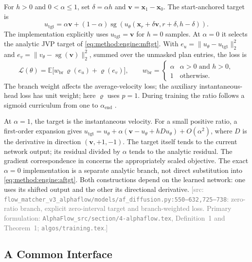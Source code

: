 \documentclass[headsepline,footsepline,footinclude=false,oneside,fontsize=11pt,paper=a4,listof=totoc,bibliography=totoc]{scrbook}
\theoremstyle{definition}
\theoremstyle{plain}
\theoremstyle{remark}
\newcommand{\vect}[1]{\boldsymbol{#1}}
\newcommand{\sidx}[1]{_{\textrm{#1}}}
\newcommand{\E}{\mathbb{E}}                    %
\newcommand{\sg}{\operatorname{sg}}            %
\newcommand{\vfield}{v}                        %
\newcommand{\afield}{u}                        %
\newif\ifsubmission
\newcommand{\srcnote}[1]{\ifsubmission\else\textcolor{gray}{\footnotesize\textsf{[src: #1]}}\fi}
\begin{document}
For $h>0$ and $0<\alpha\le1$, set $\delta=\alpha h$ and
$\vect{v}=\vect{x}_{1}-\vect{x}_{0}$. The start-anchored target is
\begin{equation}\label{eq:method:engine:aftgt}
  \afield\sidx{tgt}
  =\alpha\vect{v}+(1-\alpha)\sg\!\left(
    \afield_{\theta}(\vect{x}_{r}+\delta\vect{v},r+\delta,h-\delta)\right).
\end{equation}
The implementation explicitly uses $\afield\sidx{tgt}=\vect{v}$ for $h=0$ samples. At
$\alpha=0$ it selects the analytic JVP target of \eqref{eq:method:engine:mftgt}.
With $e_u=\|\afield_{\theta}-\afield\sidx{tgt}\|_2^2$ and
$e_v=\|\vfield_{\theta}-\sg(\vect{v})\|_2^2$, summed over the unmasked plan entries, the loss is
\begin{equation}\label{eq:method:engine:afloss}
  \mathcal{L}(\theta)=\E\big[w\sidx{br}\,\varrho(e_u)+\varrho(e_v)\big],
  \qquad
  w\sidx{br}=\begin{cases}
    \alpha & \alpha>0\text{ and }h>0,\\
    1 & \text{otherwise}.
  \end{cases}
\end{equation}
The branch weight affects the average-velocity loss; the auxiliary instantaneous-head loss has
unit weight; here $\varrho$ uses $p=1$. During training the ratio follows a sigmoid curriculum from one to
$\alpha\sidx{end}$ \parencite[Alg.~2]{zhang2025alphaflow}.

At $\alpha=1$, the target is the instantaneous velocity. For a small positive ratio, a first-order
expansion gives $\afield\sidx{tgt}=\afield_{\theta}
+\alpha(\vect{v}-\afield_{\theta}+hD\afield_{\theta})+O(\alpha^2)$, where $D$ is the derivative
in direction $(\vect{v},+1,-1)$. The target itself tends to the current network output;
its residual divided by $\alpha$ tends to the analytic residual. The gradient correspondence in
\parencite[Thm.~1]{zhang2025alphaflow} concerns the appropriately scaled objective. The exact
$\alpha=0$ implementation is a separate analytic branch, not direct substitution into
\eqref{eq:method:engine:aftgt}. Both constructions depend on the learned network: one uses its
shifted output and the other its directional derivative.
\srcnote{\texttt{flow\_matcher\_v3\_alphaflow/models/af\_diffusion.py:550--632,725--738}:
zero-ratio branch, explicit zero-interval target and branch-weighted loss. Primary formulation:
\texttt{AlphaFlow\_src/section/4-alphaflow.tex}, Definition~1 and Theorem~1;
\texttt{algos/training.tex}.}

\subsection{A Common Interface}\label{sec:method:interface}
\end{document}

